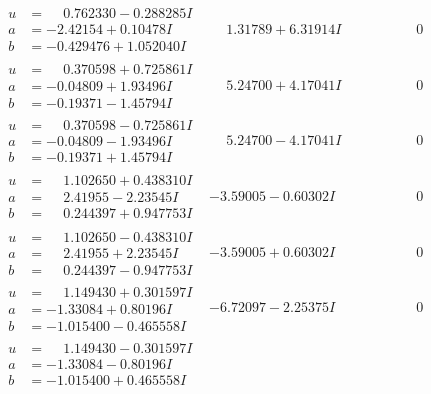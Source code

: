\documentclass[1p]{elsarticle_modified}
\theoremstyle{definition}
\begin{document}
$$\begin{array}{c|c|c}
\begin{aligned}
u &= \phantom{-}0.762330 - 0.288285 I \\
a &= -2.42154 + 0.10478 I \\
b &= -0.429476 + 1.052040 I\end{aligned}
 & \phantom{-}1.31789 + 6.31914 I & \phantom{-0.000000 } 0 \\ \hline\begin{aligned}
u &= \phantom{-}0.370598 + 0.725861 I \\
a &= -0.04809 + 1.93496 I \\
b &= -0.19371 - 1.45794 I\end{aligned}
 & \phantom{-}5.24700 + 4.17041 I & \phantom{-0.000000 } 0 \\ \hline\begin{aligned}
u &= \phantom{-}0.370598 - 0.725861 I \\
a &= -0.04809 - 1.93496 I \\
b &= -0.19371 + 1.45794 I\end{aligned}
 & \phantom{-}5.24700 - 4.17041 I & \phantom{-0.000000 } 0 \\ \hline\begin{aligned}
u &= \phantom{-}1.102650 + 0.438310 I \\
a &= \phantom{-}2.41955 - 2.23545 I \\
b &= \phantom{-}0.244397 + 0.947753 I\end{aligned}
 & -3.59005 - 0.60302 I & \phantom{-0.000000 } 0 \\ \hline\begin{aligned}
u &= \phantom{-}1.102650 - 0.438310 I \\
a &= \phantom{-}2.41955 + 2.23545 I \\
b &= \phantom{-}0.244397 - 0.947753 I\end{aligned}
 & -3.59005 + 0.60302 I & \phantom{-0.000000 } 0 \\ \hline\begin{aligned}
u &= \phantom{-}1.149430 + 0.301597 I \\
a &= -1.33084 + 0.80196 I \\
b &= -1.015400 - 0.465558 I\end{aligned}
 & -6.72097 - 2.25375 I & \phantom{-0.000000 } 0 \\ \hline\begin{aligned}
u &= \phantom{-}1.149430 - 0.301597 I \\
a &= -1.33084 - 0.80196 I \\
b &= -1.015400 + 0.465558 I\end{aligned}

\end{array}$$
\end{document}
